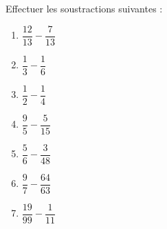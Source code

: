 
\begin{exercice}\label{exo2smath-0039}

    Effectuer les soustractions suivantes :
    \begin{multicols}{3}
        \begin{enumerate}
            \item
                \( \dfrac{  12  }{ 13 }-\dfrac{  7  }{ 13 }\) 
            \item
                \( \dfrac{  1  }{ 3 }-\dfrac{  1  }{ 6 }\) 
            \item
                \( \dfrac{  1  }{ 2 }-\dfrac{  1  }{ 4 }\) 
            \item
                \( \dfrac{  9  }{5 }-\dfrac{  5  }{ 15 }\) 
            \item
                \( \dfrac{  5  }{ 6 }-\dfrac{  3  }{ 48 }\) 
            \item
                \( \dfrac{  9  }{ 7 }-\dfrac{  64  }{ 63 }\) 
            \item
                \( \dfrac{  19  }{ 99 }-\dfrac{  1  }{ 11 }\) 
        \end{enumerate}
    \end{multicols}


\end{exercice}
